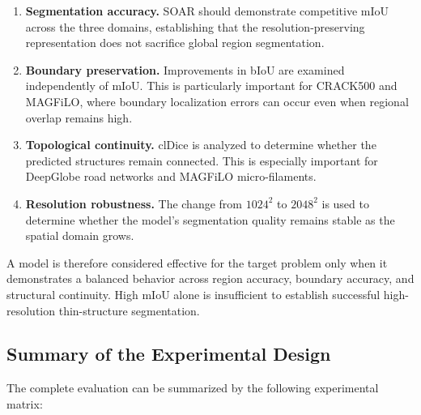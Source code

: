 \documentclass[11pt,a4paper]{article}
\begin{document}
\begin{enumerate}

    \item \textbf{Segmentation accuracy.}
    SOAR should demonstrate competitive mIoU across the three domains, 
    establishing that the resolution-preserving representation does not 
    sacrifice global region segmentation.

    \item \textbf{Boundary preservation.}
    Improvements in bIoU are examined independently of mIoU. This is 
    particularly important for CRACK500 and MAGFiLO, where boundary 
    localization errors can occur even when regional overlap remains high.

    \item \textbf{Topological continuity.}
    clDice is analyzed to determine whether the predicted structures remain 
    connected. This is especially important for DeepGlobe road networks and 
    MAGFiLO micro-filaments.

    \item \textbf{Resolution robustness.}
    The change from $1024^2$ to $2048^2$ is used to determine whether the 
    model's segmentation quality remains stable as the spatial domain grows.

\end{enumerate}

A model is therefore considered effective for the target problem only when 
it demonstrates a balanced behavior across region accuracy, boundary 
accuracy, and structural continuity. High mIoU alone is insufficient to 
establish successful high-resolution thin-structure segmentation.

\subsection{Summary of the Experimental Design}

The complete evaluation can be summarized by the following experimental 
matrix:
\end{document}
